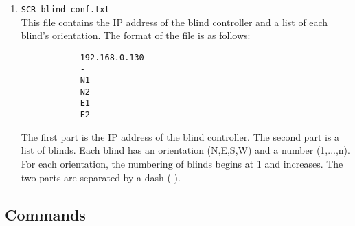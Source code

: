 \documentclass[twoside]{article}
\begin{document}
	\begin{enumerate}
		\item \verb|SCR_blind_conf.txt|\\
		This file contains the IP address of the blind controller and a list of each blind's orientation. The format of the file is as follows:
		
		\begin{verbatim}
		    192.168.0.130
		    -
		    N1
		    N2
		    E1
		    E2
		\end{verbatim}
		The first part is the IP address of the blind controller. The second part is a list of blinds. Each blind has an orientation (N,E,S,W) and a number (1,...,n). For each orientation, the numbering of blinds begins at 1 and increases. The two parts are separated by a dash (-).
		
	\end{enumerate}

	
	\subsection{Commands}
	
\end{document}
